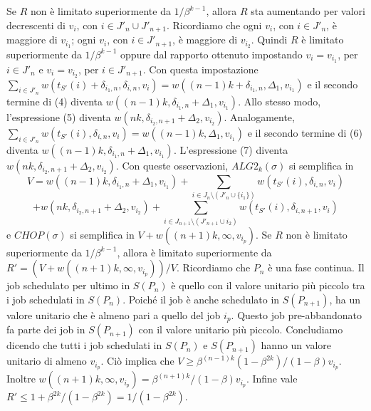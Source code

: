 \documentclass[twoside,openany,titlepage,fleqn,
	headinclude,12pt,a4paper,BCOR5mm,footinclude]{scrbook}
\begin{document}
Se $R$ non è limitato superiormente da $1 / \beta^{k-1}$, allora $R$ sta aumentando per valori decrescenti di $v_{i}$, con $i \in J'_{n} \cup J'_{n+1}$. Ricordiamo che ogni $v_{i}$, con $i \in J'_{n}$, è maggiore di $v_{i_{1}}$; ogni $v_{i}$, con $i \in J'_{n+1}$, è maggiore di $v_{i_{2}}$. Quindi $R$ è limitato superiormente da $1 / \beta^{k-1}$ oppure dal rapporto ottenuto impostando $v_{i} = v_{i_{1}}$, per $i \in J'_{n}$ e $v_{i} = v_{i_{2}}$, per $i \in J'_{n+1}$. Con questa impostazione $\sum_{i \in J'_{n}} w(t_{S'}(i) + \delta_{i_{1},n}, \delta_{i,n}, v_{i}) = w ((n -1) k + \delta_{i_{1},n}, \Delta_{1}, v_{i_{1}})$ e il secondo termine di (4) diventa $w((n - 1) k, \delta_{i_{1},n} + \Delta_{1}, v_{i_{1}})$. Allo stesso modo, l'espressione (5) diventa $w (nk, \delta_{i_{2}, n+1} + \Delta_{2}, v_{i_{2}})$. Analogamente, $\sum_{i\in J'_{n}} w (t_{S'}(i), \delta_{i,n}, v_{i}) = w ((n -1) k, \Delta_{1}, v_{i_{1}})$ e il secondo termine di (6) diventa $w ((n - 1 ) k, \delta_{i_{1},n} + \Delta_{1}, v_{i_{1}})$.
L'espressione (7) diventa $w (nk, \delta_{i_{2}, n+1} + \Delta_{2}, v_{i_{2}})$. Con queste osservazioni, $ALG2_{k} (\sigma)$ si semplifica in
$$V = w ((n - 1) k, \delta_{i_{1},n} + \Delta_{1}, v_{i_{1}}) + \sum_{i\in J_{n} \setminus (J'_{n}\cup \{i_{1}\})} w(t_{S'} (i), \delta_{i,n}, v_{i})$$
$$+ w (nk, \delta_{i_{2}, n+1} + \Delta_{2}, v_{i_{2}}) + \sum_{i \in J_{n+1} \setminus (J'_{n+1} \cup {i_{2}})} w(t_{S'} (i), \delta_{i,n+1}, v_{i})$$
e $CHOP(\sigma)$ si semplifica in $V + w ((n + 1) k, \infty, v_{i_{p}})$. Se $R$ non è limitato superiormente da $1 / \beta^{k-1}$, allora è limitato superiormente da $R' = (V + w ((n + 1) k, \infty, v_{i_{p}})) / V$. Ricordiamo che $P_{n}$ è una fase continua. Il job schedulato per ultimo in $S(P_{n})$ è quello con il valore unitario più piccolo tra i job schedulati in $S(P_{n})$. Poiché il job è anche schedulato in $S(P_{n + 1})$, ha un valore unitario che è almeno pari a quello del job $i_{p}$. Questo job pre-abbandonato fa parte dei job in $S (P_{n + 1})$ con il valore unitario più piccolo. Concludiamo dicendo che tutti i job schedulati in $S (P_{n})$ e $S (P_{n + 1})$ hanno un valore unitario di almeno $v_{i_{p}}$. Ciò implica che $V \geq \beta^{(n - 1) k} (1 - \beta^{2k}) / (1 - \beta) v_{i_{p}}$. Inoltre $w ((n + 1) k, \infty, v_{i_{p}}) = \beta^{(n + 1) k} / (1 - \beta) v_{i_{p}}$. Infine vale $R' \leq 1 + \beta^{2k} / (1 - \beta^{2k}) = 1 / (1 - \beta^{2k}).$
\end{document}

